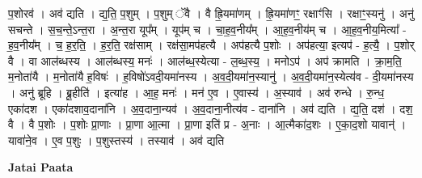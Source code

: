 \documentclass[17pt]{extarticle}
\begin{document}
प॒शोरव॑ । अव॑ द्यति । द्य॒ति॒ प॒शुम् । प॒शुम् ॅवै । वै ह्रि॒यमा॑णम् । ह्रि॒यमा॑णꣳ॒॒ रक्षाꣳ॑सि । रक्षाꣳ॒॒स्यनु॑ । अनु॑ सचन्ते । स॒च॒न्ते॒ऽन्त॒रा । अ॒न्त॒रा यूप᳚म् । यूप॑म् च । चा॒ह॒व॒नीय᳚म् । आ॒ह॒व॒नीय॑म् च । आ॒ह॒व॒नीय॒मित्या᳚ - ह॒व॒नीय᳚म् । च॒ ह॒र॒ति॒ । ह॒र॒ति॒ रक्ष॑साम् । रक्ष॑सा॒मप॑हत्यै । अप॑हत्यै प॒शोः । अप॑हत्या॒ इत्यप॑ - ह॒त्यै॒ । प॒शोर् वै । वा आल॑ब्धस्य । आल॑ब्धस्य॒ मनः॑ । आल॑ब्ध॒स्येत्या - ल॒ब्ध॒स्य॒ । मनोऽप॑ । अप॑ क्रामति । क्रा॒म॒ति॒ म॒नोता॑यै । म॒नोता॑यै ह॒विषः॑ । ह॒विषो॑ऽवदी॒यमा॑नस्य । अ॒व॒दी॒यमा॑न॒स्यानु॑ । अ॒व॒दी॒यमा॑न॒स्येत्य॑व - दी॒यमा॑नस्य । अनु॑ ब्रूहि । ब्रू॒हीति॑ । इत्या॑ह । आ॒ह॒ मनः॑ । मन॑ ए॒व । ए॒वास्य॑ । अ॒स्याव॑ । अव॑ रुन्धे । रु॒न्ध॒ एका॑दश । एका॑दशाव॒दाना॑नि । अ॒व॒दाना॒न्यव॑ । अ॒व॒दाना॒नीत्य॑व - दाना॑नि । अव॑ द्यति । द्य॒ति॒ दश॑ । दश॒ वै । वै प॒शोः । प॒शोः प्रा॒णाः । प्रा॒णा आ॒त्मा । प्रा॒णा इति॑ प्र - अ॒नाः । आ॒त्मैका॑द॒शः । ए॒का॒द॒शो यावान्॑ । यावा॑ने॒व । ए॒व प॒शुः । प॒शुस्तस्य॑ । तस्याव॑ । अव॑ द्यति \newline

\textbf{Jatai Paata} \newline
\end{document}
